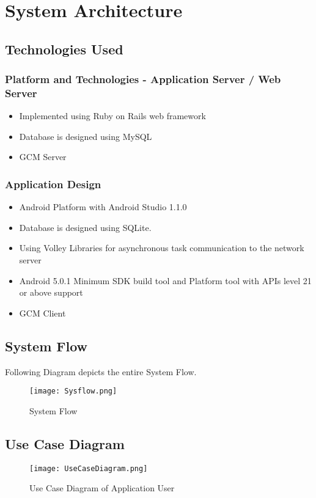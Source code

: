 \chapter{System Architecture}

\section{Technologies Used}
\subsection{Platform and Technologies - Application Server / Web Server}
\begin{itemize}
  \item Implemented using Ruby on Rails web framework \cite{Ruby}
  \item Database is designed using MySQL
  \item GCM Server
\end{itemize}

\subsection{Application Design}

\begin{itemize}
\item Android Platform with Android Studio 1.1.0 \cite{Intro42:online}
\item Database is designed using SQLite.
\item Using Volley Libraries for asynchronous task communication to the network server \cite{Andro34:online}
\item Android 5.0.1 Minimum SDK build tool and Platform tool with APIs level 21 or above support
\item GCM Client
\end{itemize}

\section{System Flow}

Following Diagram depicts the entire System Flow.
\begin{figure}[H]
    \centering
	\texttt{[image: Sysflow.png]}
    \caption{System Flow}
    \label{fig:System Flow}
\end{figure}

\section{Use Case Diagram}
\begin{figure}[H]
    \centering
	\texttt{[image: UseCaseDiagram.png]}
    \caption{Use Case Diagram of Application User}
    \label{fig:Use Case Diagram of Application User}
\end{figure}

